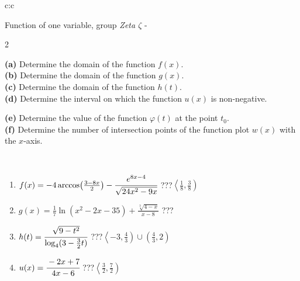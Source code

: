 \documentclass[10pt]{report}
\begin{document}
\begin{tabular}{c:c}
\begin{minipage}[c][104.5mm][t]{0.5\linewidth}
\begin{center}
\vspace{7mm}
{\huge Function of one variable, group \textit{Zeta $\zeta$} -}\\[5mm]
\begin{minipage}{0.95\linewidth}
\begin{center}
{\small \begin{multicols}{2} \raggedright
\textbf{(a)} Determine the domain of the function \(f(x)\). \\[1mm]
\textbf{(b)} Determine the domain of the function \(g(x)\). \\[1mm]
\textbf{(c)} Determine the domain of the function \(h(t)\). \\[1mm]
\textbf{(d)} Determine the interval on which the function \(u(x)\) is non-negative. \par \columnbreak
\textbf{(e)} Determine the value of the function \(\varphi(t)\) at the point \(t_0\). \\[1mm]
\textbf{(f)} Determine the number of intersection points of the function plot \(w(x)\) with the \(x\)-axis. \\[1mm]
\end{multicols}
}
\end{center}
\end{minipage}
\\[4mm]
\begin{minipage}{0.79\linewidth}
\begin{center}
\begin{varwidth}{\linewidth}
\begin{enumerate}
\small
\item $f(x) = -4\arccos\!\left( \frac{3-8x}{2} \right) - \cfrac{e^{8x-4}}{\sqrt{24x^2-9x}}$\quad \dotfill\; ???\;\dotfill \quad $\left\langle\frac{1}{8} , \frac{3}{8}\right)$
\item $g(x) = \frac{1}{7} \ln{\!(x^2-2x-35)}+\frac{\sqrt[3]{4-x}}{x-8}$\quad \dotfill\; ???\;\dotfill {}
\item $h(t) = \cfrac{\sqrt{9-t^2}}{\log_4(3-\frac{3}{2}t)}$\quad \dotfill\; ???\;\dotfill \quad $\left\langle-3 , \frac{4}{3}\right)\cup\left(\frac{4}{3} , 2\right)$
\item $u(x) = \cfrac{-2x+7}{4x-6}$\quad \dotfill\; ???\;\dotfill \quad $\left\langle\frac{3}{2} , \frac{7}{2}\right)$

\end{enumerate}
\end{varwidth}
\end{center}
\end{minipage}
\end{center}
\end{minipage}
\end{tabular}
\end{document}
